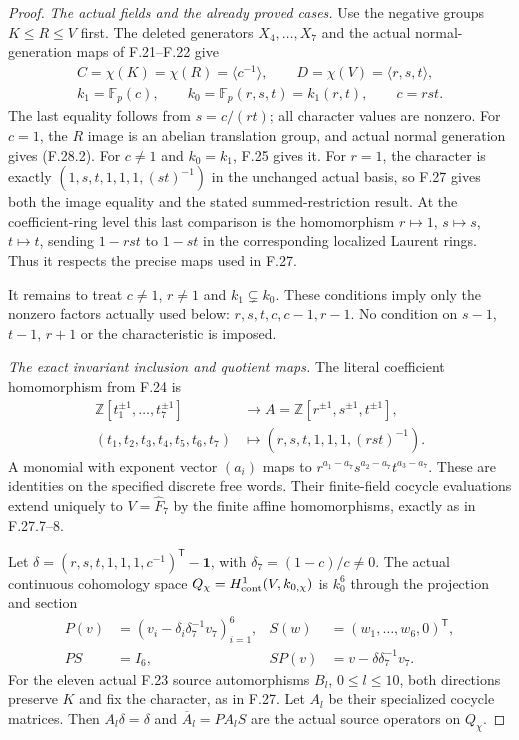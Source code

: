 \begin{proof}
\emph{The actual fields and the already proved cases.}
Use the negative groups $K\leq R\leq V$ first.
The deleted generators $X_4,\ldots,X_7$ and the
actual normal-generation maps of F.21--F.22 give
\[
 \begin{gathered}
 C=\chi(K)=\chi(R)=\langle c^{-1}\rangle,
 \qquad D=\chi(V)=\langle r,s,t\rangle,\\
 k_1=\mathbb F_p(c),\qquad
 k_0=\mathbb F_p(r,s,t)=k_1(r,t),\qquad c=rst.
 \end{gathered}                                                \tag{F.28.3}
\]
The last equality follows from $s=c/(rt)$;
all character values are nonzero.
For $c=1$, the $R$ image is an abelian translation
group, and actual normal generation gives (F.28.2).
For $c\ne1$ and $k_0=k_1$, F.25 gives it.
For $r=1$, the character is exactly
$(1,s,t,1,1,1,(st)^{-1})$ in the unchanged actual
basis, so F.27 gives both the image equality
and the stated summed-restriction result.
At the coefficient-ring level this last comparison
is the homomorphism $r\mapsto1$, $s\mapsto s$,
$t\mapsto t$, sending $1-rst$ to $1-st$ in
the corresponding localized Laurent rings.
Thus it respects the precise maps used in F.27.

It remains to treat $c\ne1$, $r\ne1$ and
$k_1\subsetneq k_0$. These conditions imply
only the nonzero factors actually used below:
$r,s,t,c,c-1,r-1$. No condition on $s-1$,
$t-1$, $r+1$ or the characteristic is imposed.

\emph{The exact invariant inclusion and quotient maps.}
The literal coefficient homomorphism from F.24 is
\[
 \begin{aligned}
 \mathbb Z[t_1^{\pm1},\ldots,t_7^{\pm1}]&\longrightarrow
                   A=\mathbb Z[r^{\pm1},s^{\pm1},t^{\pm1}],\\
 (t_1,t_2,t_3,t_4,t_5,t_6,t_7)
          &\longmapsto(r,s,t,1,1,1,(rst)^{-1}).
 \end{aligned}                                                \tag{F.28.4}
\]
A monomial with exponent vector $(a_i)$ maps to
$r^{a_1-a_7}s^{a_2-a_7}t^{a_3-a_7}$.
These are identities on the specified discrete
free words. Their finite-field cocycle evaluations
extend uniquely to $V=\widehat F_7$ by the finite
affine homomorphisms, exactly as in F.27.7--8.

Let $\delta=(r,s,t,1,1,1,c^{-1})^{\mathsf T}
-\mathbf1$, with $\delta_7=(1-c)/c\ne0$.
The actual continuous cohomology space
$Q_\chi=H^1_{\rm cont}(V,k_{0,\chi})$ is $k_0^6$
through the projection and section
\[
 \begin{aligned}
 P(v)&=(v_i-\delta_i\delta_7^{-1}v_7)_{i=1}^6,
       &S(w)&=(w_1,\ldots,w_6,0)^{\mathsf T},\\
 PS&=I_6,
       &SP(v)&=v-\delta\delta_7^{-1}v_7.
 \end{aligned}                                                \tag{F.28.5}
\]
For the eleven actual F.23 source automorphisms
$B_l$, $0\leq l\leq10$, both directions preserve
$K$ and fix the character, as in F.27.
Let $A_l$ be their
specialized cocycle matrices. Then $A_l\delta=\delta$
and $\overline A_l=PA_lS$ are the actual source
operators on $Q_\chi$.


\end{proof}
